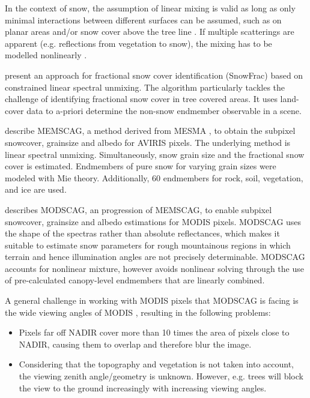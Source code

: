 \documentclass[a4paper,10pt]{article}
\begin{document}
In the context of snow, the assumption of linear mixing is valid as long as only minimal interactions between different surfaces can be assumed, such as on planar areas and/or snow cover above the tree line \citep{Painter2009, Dozier2004}. If multiple scatterings are apparent (e.g. reflections from vegetation to snow), the mixing has to be modelled nonlinearly \citep{Roberts1993}.

\cite{Vikhamar2003} present an approach for fractional snow cover identification (SnowFrac) based on constrained linear spectral unmixing. The algorithm particularly tackles the challenge of identifying fractional snow cover in tree covered areas. It uses land-cover data to a-priori determine the non-snow endmember observable in a scene.

\cite{Painter2003} describe \gls{MEMSCAG}, a method derived from \gls{MESMA} \citep{Roberts1998}, to obtain the subpixel snowcover, grainsize and albedo for \gls{AVIRIS} pixels. The underlying method is linear spectral unmixing. Simultaneously, snow grain size and the fractional snow cover is estimated. Endmembers of pure snow for varying grain sizes were modeled with Mie theory. Additionally, 60 endmembers for rock, soil, vegetation, and ice are used.

\Cite{Painter2009} describes \gls{MODSCAG}, an progression of \gls{MEMSCAG}, to enable subpixel snowcover, grainsize and albedo estimations for \gls{MODIS} pixels. \gls{MODSCAG} uses the shape of the spectras rather than absolute reflectances, which makes it suitable to estimate snow parameters for rough mountainous regions in which terrain and hence illumination angles are not precisely determinable. \gls{MODSCAG} accounts for nonlinear mixture, however avoids nonlinear solving through the use of pre-calculated canopy-level endmembers that are linearly combined.

A general challenge in working with \gls{MODIS} pixels that \gls{MODSCAG} is facing is the wide viewing angles of \gls{MODIS} \citep{Dozier2009, Dozier2008, Liu2008}, resulting in the following problems:
\begin{itemize}
 \item Pixels far off NADIR cover more than 10 times the area of pixels close to NADIR, causing them to overlap and therefore blur the image.
 \item Considering that the topography and vegetation is not taken into account, the viewing zenith angle/geometry is unknown. However, e.g. trees will block the view to the ground increasingly with increasing viewing angles.
\end{itemize}
\end{document}

